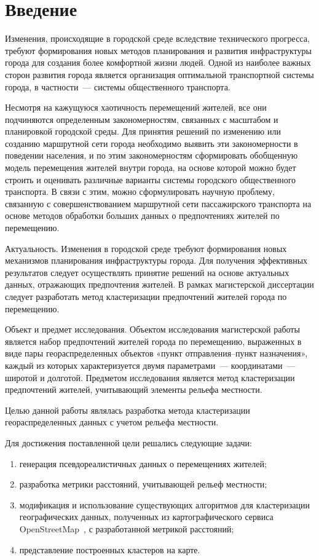 \part{Введение}

Изменения, происходящие в городской среде вследствие технического прогресса, требуют формирования новых методов планирования и развития инфраструктуры города для создания более комфортной жизни людей. Одной из наиболее важных сторон развития города является организация оптимальной транспортной системы города, в частности~--- системы общественного транспорта.

Несмотря на кажущуюся хаотичность перемещений жителей, все они подчиняются определенным закономерностям, связанных с масштабом и планировкой городской среды. Для принятия решений по изменению или созданию маршрутной сети города необходимо выявить эти закономерности в поведении населения, и по этим закономерностям сформировать обобщенную модель перемещения жителей внутри города, на основе которой можно будет строить и оценивать различные варианты системы городского общественного транспорта. В связи с этим, можно сформулировать научную проблему, связанную с совершенствованием маршрутной сети пассажирского транспорта на основе методов обработки больших данных о предпочтениях жителей по перемещению.

Актуальность. Изменения в городской среде требуют формирования новых механизмов планирования инфраструктуры города. Для получения эффективных результатов следует осуществлять принятие решений на основе актуальных данных, отражающих предпочтения жителей. В рамках магистерской диссертации следует разработать метод кластеризации предпочтений жителей города по перемещению.

Объект и предмет исследования. Объектом исследования магистерской работы является набор предпочтений жителей города по перемещению, выраженных в виде пары геораспределенных объектов «пункт отправления--пункт назначения», каждый из которых характеризуется двумя параметрами~--- координатами~--- широтой и долготой. Предметом исследования является метод кластеризации предпочтений жителей, учитывающий элементы рельефа местности.

Целью данной работы являлась разработка метода кластеризации геораспределенных данных с учетом рельефа местности.

Для достижения поставленной цели решались следующие задачи:
\begin{enumerate}
    \item генерация псевдореалистичных данных о перемещениях жителей;
    \item разработка метрики расстояний, учитывающей рельеф местности;
    \item модификация и использование существующих алгоритмов для кластеризации географических данных, полученных из картографического сервиса OpenStreetMap~\cite{OSM}, с разработанной метрикой расстояний;
    \item представление построенных кластеров на карте.
\end{enumerate}

